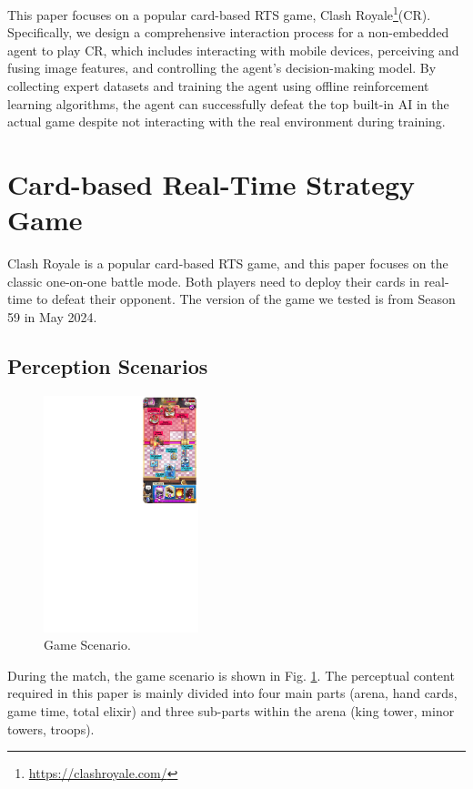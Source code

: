 \documentclass[runningheads]{llncs}
\newcounter{algorithm}
\begin{document}
\noindent This paper focuses on a popular card-based RTS game, Clash Royale\footnote{\url{https://clashroyale.com/}}(CR).
Specifically, we design a comprehensive interaction process for a non-embedded agent to play CR, which includes interacting with mobile devices,
perceiving and fusing image features, and controlling the agent's decision-making model.
By collecting expert datasets and training the agent using offline reinforcement learning algorithms,
the agent can successfully defeat the top built-in AI in the actual game despite not interacting with the real environment during training.

\section{Card-based Real-Time Strategy Game}
Clash Royale is a popular card-based RTS game, and this paper focuses on the classic one-on-one battle mode.
Both players need to deploy their cards in real-time to defeat their opponent.
The version of the game we tested is from Season 59 in May 2024.

\subsection{Perception Scenarios}
\begin{figure} %
  \centering\vspace{-5.5ex}
  \includegraphics[width=0.4\textwidth]{figures/introduction.pdf}
  \caption{Game Scenario.}\label{fig-introduction}
\end{figure}
During the match, the game scenario is shown in Fig. \ref{fig-introduction}.
The perceptual content required in this paper is mainly divided into four main parts (arena, hand cards, game time, total elixir)
and three sub-parts within the arena (king tower, minor towers, troops).
\end{document}
